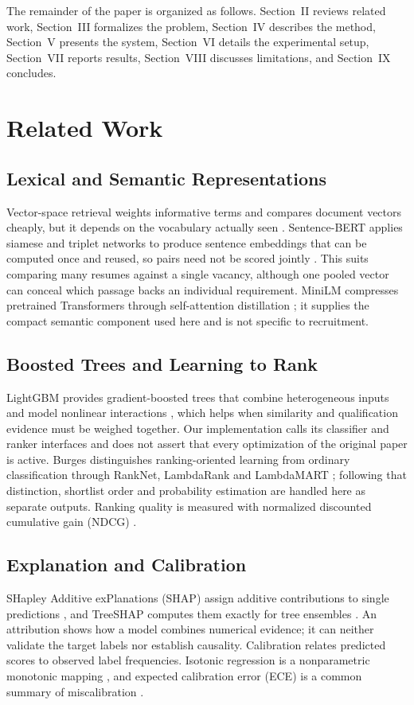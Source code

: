\documentclass[conference]{IEEEtran}
\begin{document}
The remainder of the paper is organized as follows. Section~II reviews related work, Section~III formalizes the problem, Section~IV describes the method, Section~V presents the system, Section~VI details the experimental setup, Section~VII reports results, Section~VIII discusses limitations, and Section~IX concludes.

\section{Related Work}
\subsection{Lexical and Semantic Representations}
Vector-space retrieval weights informative terms and compares document vectors cheaply, but it depends on the vocabulary actually seen \cite{b1}. Sentence-BERT applies siamese and triplet networks to produce sentence embeddings that can be computed once and reused, so pairs need not be scored jointly \cite{b2}. This suits comparing many resumes against a single vacancy, although one pooled vector can conceal which passage backs an individual requirement. MiniLM compresses pretrained Transformers through self-attention distillation \cite{b3}; it supplies the compact semantic component used here and is not specific to recruitment.

\subsection{Boosted Trees and Learning to Rank}
LightGBM provides gradient-boosted trees that combine heterogeneous inputs and model nonlinear interactions \cite{b4}, which helps when similarity and qualification evidence must be weighed together. Our implementation calls its classifier and ranker interfaces and does not assert that every optimization of the original paper is active. Burges distinguishes ranking-oriented learning from ordinary classification through RankNet, LambdaRank and LambdaMART \cite{b5}; following that distinction, shortlist order and probability estimation are handled here as separate outputs. Ranking quality is measured with normalized discounted cumulative gain (NDCG) \cite{b6}.

\subsection{Explanation and Calibration}
SHapley Additive exPlanations (SHAP) assign additive contributions to single predictions \cite{b7}, and TreeSHAP computes them exactly for tree ensembles \cite{b8}. An attribution shows how a model combines numerical evidence; it can neither validate the target labels nor establish causality. Calibration relates predicted scores to observed label frequencies. Isotonic regression is a nonparametric monotonic mapping \cite{b9}, and expected calibration error (ECE) is a common summary of miscalibration \cite{b10}.
\end{document}
